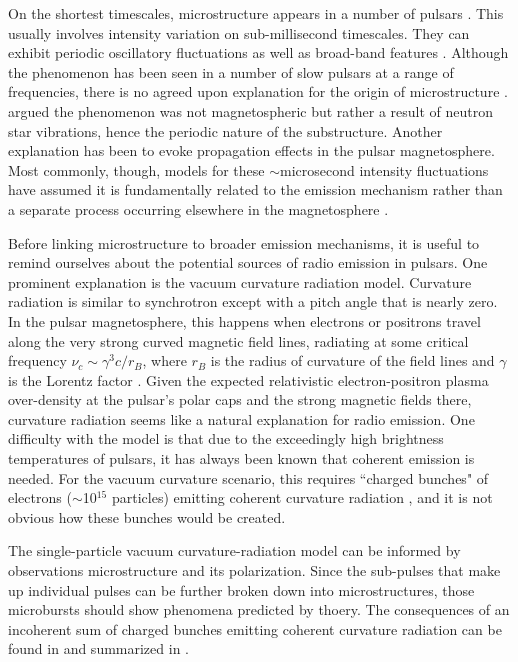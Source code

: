 On the shortest timescales, microstructure appears in a number of pulsars 
\citep{1975PhDT.........9C, 1982ApJ...254L..35B, 
1998A&A...332..111L, 2002A&A...396..171P}. 
This usually involves 
intensity variation on sub-millisecond timescales. 
They can exhibit periodic oscillatory fluctuations 
as well as broad-band features \citep{1981A&A....93...85B}. 
Although the phenomenon has been seen in a number of slow pulsars 
at a range of frequencies, there is 
no agreed upon explanation for the origin of microstructure 
\citep{1998A&A...332..111L}. 
\citet{vanhorn} argued the phenomenon was not magnetospheric
but rather a result of neutron star vibrations, 
hence the periodic nature of the substructure. 
Another explanation has been to evoke propagation 
effects in the pulsar magnetosphere. Most commonly, though, 
models for these $\sim$microsecond intensity 
fluctuations have assumed it is fundamentally 
related to the emission mechanism 
rather than a separate process occurring elsewhere 
in the magnetosphere \citep{1998A&A...332..111L}.

Before linking microstructure to broader emission mechanisms, 
it is useful to remind ourselves about the potential 
sources of radio emission in pulsars. 
One prominent explanation is the vacuum curvature 
radiation model. Curvature radiation is similar to 
synchrotron except with a pitch angle that is nearly zero.
In the pulsar magnetosphere, this happens when electrons or positrons 
travel along the very strong curved
magnetic field lines, radiating 
at some critical frequency $\nu_c \sim \gamma^3 c/r_B$, 
where $r_B$ is the radius of curvature of the field lines and 
$\gamma$ is the Lorentz factor
\citep{1998pulsarastronomy}. Given the 
expected relativistic electron-positron plasma over-density at the
pulsar's polar caps and the strong magnetic fields there, 
curvature radiation seems like a natural explanation 
for radio emission. One difficulty with the model is that 
due to the exceedingly high brightness temperatures of 
pulsars, it has always been known that 
coherent emission is needed. For the vacuum curvature 
scenario, this requires ``charged bunches" of electrons 
($\sim$10$^{15}$ particles) emitting coherent curvature radiation 
\citep{2004ApJ...600..872G}, and it is not obvious 
how these bunches would be created.

The single-particle vacuum curvature-radiation model 
can be informed by observations microstructure and 
its polarization. Since the sub-pulses that make 
up individual pulses can be further broken down into 
microstructures, those microbursts should show phenomena 
predicted by thoery. The consequences of 
an incoherent sum of charged bunches 
emitting coherent curvature radiation can be found 
in \citet{1990A&A...234..269G} and summarized 
in \citet{2015ApJ...806..236M}.

